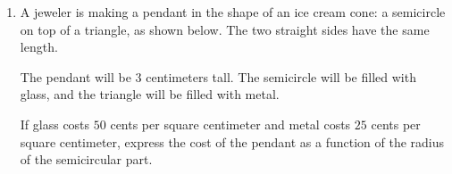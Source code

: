\documentclass{article}
\begin{document}
\begin{enumerate}[resume]
\item  \label{modeling-pendant} %

  \begin{problem}[\newpage]
    A jeweler is making a pendant in the shape of an ice cream cone: a semicircle on top of a triangle, as shown below. The two straight sides have the same length.

    The pendant will be $3$ centimeters tall. The semicircle will be filled with glass, and the triangle will be filled with metal.

    If glass costs $50$ cents per square centimeter and metal costs $25$ cents per square centimeter, express the cost of the pendant as a function of the radius of the semicircular part.

  \end{problem}  

\end{enumerate}
\end{document}
